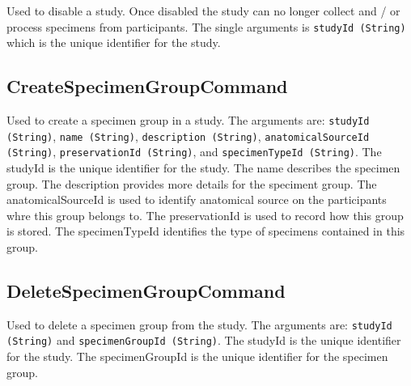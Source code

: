 Used to disable a study. Once disabled the study can no longer collect and / or
process specimens from participants. The single arguments is \texttt{studyId
  (String)} which is the unique identifier for the study.

\subsection*{CreateSpecimenGroupCommand}

Used to create a specimen group in a study. The arguments are: \texttt{studyId
  (String)}, \texttt{name (String)}, \texttt{description (String)},
\texttt{anatomicalSourceId (String)}, \texttt{preservationId (String)}, and
\texttt{specimenTypeId (String)}. The studyId is the unique identifier for the
study. The name describes the specimen group. The description provides more
details for the speciment group.  The anatomicalSourceId is used to identify
anatomical source on the participants whre this group belongs to.  The
preservationId is used to record how this group is stored.  The specimenTypeId
identifies the type of specimens contained in this group.

\subsection*{DeleteSpecimenGroupCommand}

Used to delete a specimen group from the study. The arguments are:
\texttt{studyId (String)} and \texttt{specimenGroupId (String)}. The studyId is
the unique identifier for the study. The specimenGroupId is the unique
identifier for the specimen group.


